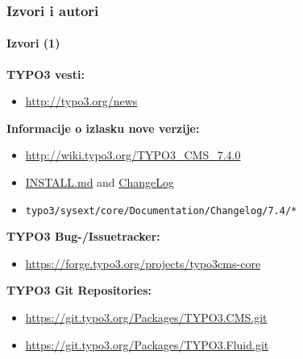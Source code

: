 \begin{frame}[fragile]
	\frametitle{Izvori i autori}
	\framesubtitle{Izvori (1)}

	\textbf{TYPO3 vesti:}
		\begin{itemize}\smaller
			\item \url{http://typo3.org/news}
		\end{itemize}

	\textbf{Informacije o izlasku nove verzije:}
		\begin{itemize}\smaller
			\item \url{http://wiki.typo3.org/TYPO3_CMS_7.4.0}
			\item \href{https://github.com/TYPO3/TYPO3.CMS/blob/master/INSTALL.md}{INSTALL.md} and \href{https://github.com/TYPO3/TYPO3.CMS/blob/master/ChangeLog}{ChangeLog}
			\item \texttt{typo3/sysext/core/Documentation/Changelog/7.4/*}
		\end{itemize}

	\textbf{TYPO3 Bug-/Issuetracker:}
		\begin{itemize}\smaller
			\item \url{https://forge.typo3.org/projects/typo3cms-core}
		\end{itemize}

	\textbf{TYPO3 Git Repositories:}
		\begin{itemize}\smaller
			\item \url{https://git.typo3.org/Packages/TYPO3.CMS.git}
			\item \url{https://git.typo3.org/Packages/TYPO3.Fluid.git}
		\end{itemize}

\end{frame}


